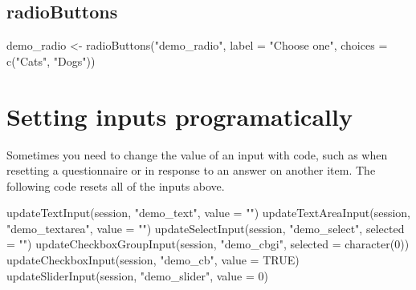 \documentclass[
]{book}
\newenvironment{Shaded}{\begin{snugshade}}{\end{snugshade}}
\newcommand{\AttributeTok}[1]{\textcolor[rgb]{0.77,0.63,0.00}{#1}}
\newcommand{\ConstantTok}[1]{\textcolor[rgb]{0.00,0.00,0.00}{#1}}
\newcommand{\DecValTok}[1]{\textcolor[rgb]{0.00,0.00,0.81}{#1}}
\newcommand{\FunctionTok}[1]{\textcolor[rgb]{0.00,0.00,0.00}{#1}}
\newcommand{\NormalTok}[1]{#1}
\newcommand{\OtherTok}[1]{\textcolor[rgb]{0.56,0.35,0.01}{#1}}
\newcommand{\StringTok}[1]{\textcolor[rgb]{0.31,0.60,0.02}{#1}}
\begin{document}
\hypertarget{radiobuttons}{%
\subsection{radioButtons}\label{radiobuttons}}

\begin{Shaded}
\begin{Highlighting}[]
\NormalTok{demo\_radio }\OtherTok{\textless{}{-}} \FunctionTok{radioButtons}\NormalTok{(}\StringTok{"demo\_radio"}\NormalTok{,}
                           \AttributeTok{label =} \StringTok{"Choose one"}\NormalTok{,}
                           \AttributeTok{choices =} \FunctionTok{c}\NormalTok{(}\StringTok{"Cats"}\NormalTok{, }\StringTok{"Dogs"}\NormalTok{))}
\end{Highlighting}
\end{Shaded}

\hypertarget{setting-inputs-programatically}{%
\section{Setting inputs programatically}\label{setting-inputs-programatically}}

Sometimes you need to change the value of an input with code, such as when resetting a questionnaire or in response to an answer on another item. The following code resets all of the inputs above.

\begin{Shaded}
\begin{Highlighting}[]
\FunctionTok{updateTextInput}\NormalTok{(session, }\StringTok{"demo\_text"}\NormalTok{, }\AttributeTok{value =} \StringTok{""}\NormalTok{)}
\FunctionTok{updateTextAreaInput}\NormalTok{(session, }\StringTok{"demo\_textarea"}\NormalTok{, }\AttributeTok{value =} \StringTok{""}\NormalTok{)}
\FunctionTok{updateSelectInput}\NormalTok{(session, }\StringTok{"demo\_select"}\NormalTok{, }\AttributeTok{selected =} \StringTok{""}\NormalTok{)}
\FunctionTok{updateCheckboxGroupInput}\NormalTok{(session, }\StringTok{"demo\_cbgi"}\NormalTok{, }\AttributeTok{selected =} \FunctionTok{character}\NormalTok{(}\DecValTok{0}\NormalTok{))}
\FunctionTok{updateCheckboxInput}\NormalTok{(session, }\StringTok{"demo\_cb"}\NormalTok{, }\AttributeTok{value =} \ConstantTok{TRUE}\NormalTok{)}
\FunctionTok{updateSliderInput}\NormalTok{(session, }\StringTok{"demo\_slider"}\NormalTok{, }\AttributeTok{value =} \DecValTok{0}\NormalTok{)}
\end{Highlighting}
\end{Shaded}
\end{document}
